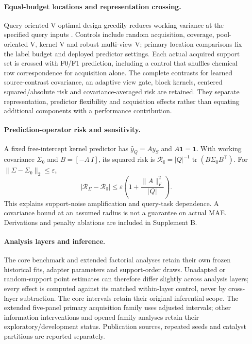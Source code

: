 \documentclass[11pt,a4paper]{article}
\begin{document}
\paragraph{Equal-budget locations and representation crossing.}
Query-oriented V-optimal design greedily reduces working variance at the specified query inputs \cite{yubi,gorodetsky2016}.
Controls include random acquisition, coverage, pool-oriented V, kernel V and robust multi-view V; primary location comparisons fix the label budget and deployed predictor settings.
Each actual acquired support set is crossed with F0/F1 prediction, including a control that shuffles chemical row correspondence for acquisition alone.
The complete contrasts for learned source-contrast covariance, an adaptive view gate, block kernels, centered squared/absolute risk and covariance-averaged risk are retained.
They separate representation, predictor flexibility and acquisition effects rather than equating additional components with a performance contribution.

\paragraph{Prediction-operator risk and sensitivity.}
A fixed free-intercept kernel predictor has $\widehat y_Q=Ay_S$ and $A\mathbf1=\mathbf1$.
With working covariance $\Sigma_0$ and $B=[-A\ I]$, its squared risk is
$\mathcal R_0=|Q|^{-1}\operatorname{tr}(B\Sigma_0B^\top)$.
For $\|\Sigma-\Sigma_0\|_2\le\varepsilon$,
\begin{equation}\label{eq:ext_bound}
|\mathcal R_\Sigma-\mathcal R_0|\le
\varepsilon\left(1+\frac{\|A\|_F^2}{|Q|}\right).
\end{equation}
This explains support-noise amplification and query-task dependence. A covariance bound at an assumed radius is not a guarantee on actual MAE.
Derivations and penalty ablations are included in Supplement B.

\paragraph{Analysis layers and inference.}
The core benchmark and extended factorial analyses retain their own frozen historical fits, adapter parameters and support-order draws.
Unadapted or random-support point estimates can therefore differ slightly across analysis layers; every effect is computed against its matched within-layer control, never by cross-layer subtraction.
The core intervals retain their original inferential scope. The extended five-panel primary acquisition family uses adjusted intervals; other information interventions and opened-family analyses retain their exploratory/development status.
Publication sources, repeated seeds and catalyst partitions are reported separately.
\end{document}
